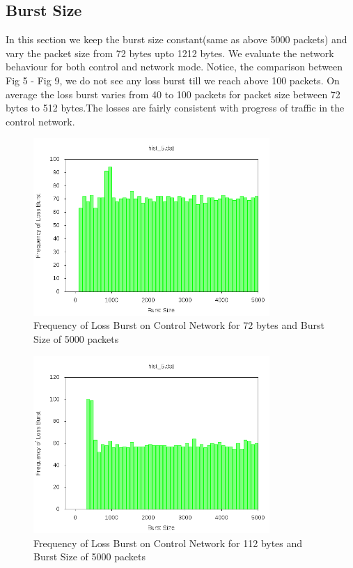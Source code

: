 \documentclass[11pt]{article}
\begin{document}
\subsection{Burst Size}
In this section we keep the burst size constant(same as above 5000 packets) and vary the packet size from 72 bytes upto 1212 bytes. We evaluate the network behaviour for both control and network mode. Notice, the comparison between Fig 5 - Fig 9, we do not see any loss burst till we reach above 100 packets. On average the loss burst varies from 40 to 100 packets for packet size between 72 bytes to 512 bytes.The losses are fairly consistent with progress of traffic in the control network.
\begin{figure}[!ht]
\centering
\includegraphics[width=0.8\textwidth]{seq50.png}
\caption{Frequency of Loss Burst on Control Network for 72 bytes and Burst Size of 5000 packets}
\end{figure}
\FloatBarrier
\begin{figure}[!ht]
\centering
\includegraphics[width=0.8\textwidth]{seq100.png}
\caption{Frequency of Loss Burst on Control Network for 112 bytes and Burst Size of 5000 packets}
\end{figure}
\end{document}
